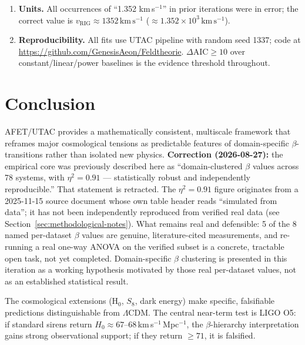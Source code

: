 \documentclass[12pt,a4paper]{article}
\theoremstyle{definition}
\newcommand{\vrig}{v_{\mathrm{RIG}}}
\begin{document}
\begin{enumerate}[leftmargin=2em, label=\arabic*.]
  \item \textbf{Units.}
        All occurrences of ``1.352 km\,s$^{-1}$'' in prior iterations
        were in error; the correct value is
        $\vrig \approx 1352\,\mathrm{km\,s^{-1}}$ ($\approx 1.352 \times 10^3\,\mathrm{km\,s^{-1}}$).

  \item \textbf{Reproducibility.}
        All fits use UTAC pipeline with random seed 1337; code at\\
        \url{https://github.com/GenesisAeon/Feldtheorie}.
        $\Delta\mathrm{AIC} \geq 10$ over constant/linear/power baselines
        is the evidence threshold throughout.
\end{enumerate}

\section{Conclusion}

AFET/UTAC provides a mathematically consistent, multiscale framework that reframes
major cosmological tensions as predictable features of domain-specific $\beta$-transitions
rather than isolated new physics.
\textbf{Correction (2026-08-27):} the empirical core was previously described here as
``domain-clustered $\beta$ values across 78 systems, with $\eta^2=0.91$ --- statistically
robust and independently reproducible.'' That statement is retracted. The $\eta^2=0.91$
figure originates from a 2025-11-15 source document whose own table header reads
``simulated from data''; it has not been independently reproduced from verified real
data (see Section~\ref{sec:methodological-notes}). What remains real and defensible:
5 of the 8 named per-dataset $\beta$ values are genuine, literature-cited measurements,
and re-running a real one-way ANOVA on the verified subset is a concrete, tractable
open task, not yet completed. Domain-specific $\beta$ clustering is presented in this
iteration as a working hypothesis motivated by those real per-dataset values, not as
an established statistical result.

The cosmological extensions (H$_0$, $S_8$, dark energy) make specific, falsifiable
predictions distinguishable from $\Lambda$CDM.
The central near-term test is LIGO O5: if standard sirens return
$H_0 \approx 67$--68\,km\,s$^{-1}$\,Mpc$^{-1}$, the $\beta$-hierarchy interpretation
gains strong observational support; if they return $\geq 71$, it is falsified.
\end{document}
